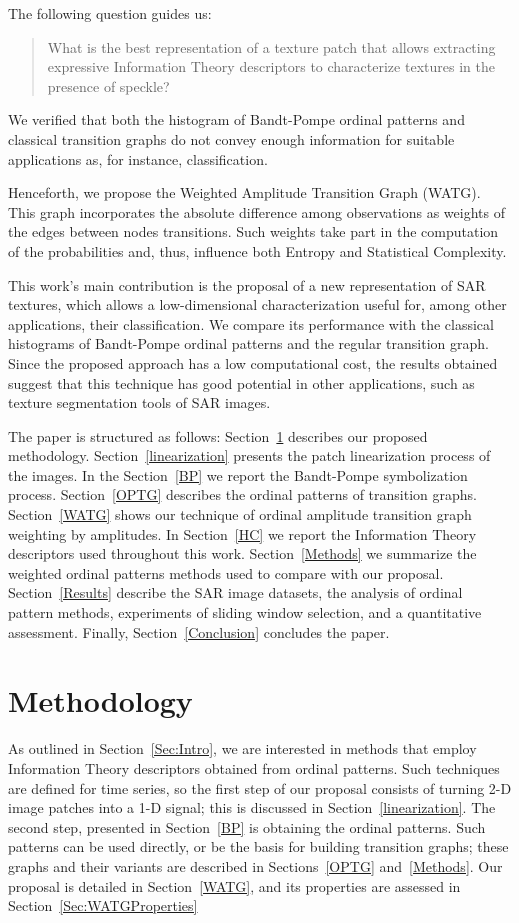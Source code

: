 \documentclass[journal]{IEEEtran}
\begin{document}
The following question guides us:
\begin{quote}
What is the best representation of a texture patch that allows extracting expressive Information Theory descriptors to characterize textures in the presence of speckle?
\end{quote}
We verified that both the histogram of Bandt-Pompe ordinal patterns and classical transition graphs do not convey enough information for suitable applications as, for instance, classification.

Henceforth, we propose the Weighted Amplitude Transition Graph (WATG).
This graph incorporates the absolute difference among observations as weights of the edges between nodes transitions.
Such weights take part in the computation of the probabilities and, thus, influence both Entropy and Statistical Complexity.

This work's main contribution is the proposal of a new representation of SAR textures, which allows a low-dimensional characterization useful for, among other applications, their classification.
We compare its performance with the classical histograms of Bandt-Pompe ordinal patterns and the regular transition graph.
Since the proposed approach has a low computational cost, the results obtained suggest that this technique has good potential in other applications, such as texture segmentation tools of SAR images.

The paper is structured as follows:
Section~\ref{methodology} describes our proposed methodology.
Section~\ref{linearization} presents the patch linearization process of the images.
In the Section~\ref{BP} we report the Bandt-Pompe symbolization process.
Section~\ref{OPTG} describes the ordinal patterns of transition graphs.
Section~\ref{WATG} shows our technique of ordinal amplitude transition graph weighting by amplitudes.
In Section~\ref{HC} we report the Information Theory descriptors used throughout this work.
Section~\ref{Methods} we summarize the weighted ordinal patterns methods used to compare with our proposal.
Section~\ref{Results} describe the SAR image datasets, 
the analysis of ordinal pattern methods, 
experiments of sliding window selection, 
and a quantitative assessment.
Finally, Section~\ref{Conclusion} concludes the paper.

\section{Methodology}\label{methodology}

As outlined in Section~\ref{Sec:Intro}, we are interested in methods that employ Information Theory descriptors obtained from ordinal patterns.
Such techniques are defined for time series, so the first step of our proposal consists of turning \mbox{2-D} image patches into a \mbox{1-D} signal; this is discussed in Section~\ref{linearization}.
The second step, presented in Section~\ref{BP} is obtaining the ordinal patterns.
Such patterns can be used directly, or be the basis for building transition graphs; these graphs and their variants are described in Sections~\ref{OPTG} and~\ref{Methods}.
Our proposal is detailed in Section~\ref{WATG}, and its properties are assessed in Section~\ref{Sec:WATGProperties}
\end{document}
